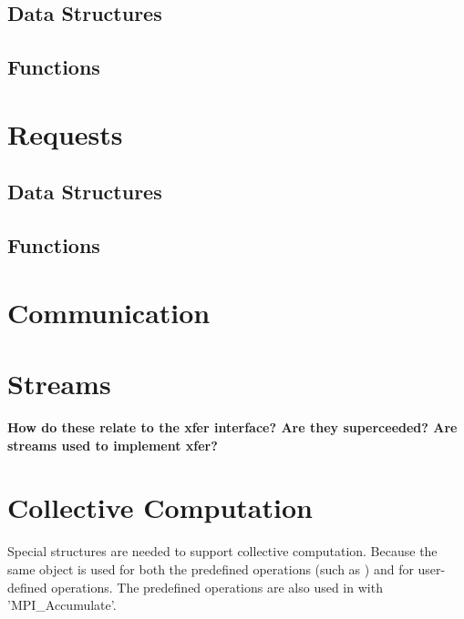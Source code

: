\documentclass[dvipdfm]{article}
\begin{document}
\subsection{Data Structures}

\subsection{Functions}


%

\section{Requests}
\subsection{Data Structures}

\subsection{Functions}


\section{Communication}



\section{Streams}
\textbf{How do these relate to the xfer interface?  Are they
superceeded?  Are streams used to implement xfer?}

%
%

\section{Collective Computation}
Special structures are needed to support collective computation.
Because the same object is used for both the predefined operations
(such as ) and for user-defined operations.  The
predefined operations are also used in with 'MPI_Accumulate'.
\end{document}
